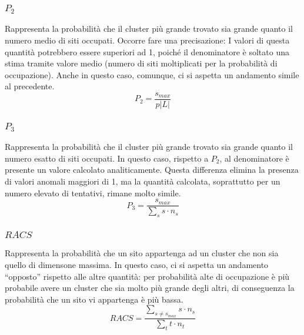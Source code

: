 \subsubsection*{$P_2$}
Rappresenta la probabilità che il cluster più grande trovato sia grande 
quanto il numero medio di siti occupati. Occorre fare una precisazione:
I valori di questa quantità potrebbero essere superiori ad 1, poiché il 
denominatore è soltato una stima tramite valore medio (numero di siti 
moltiplicati per la probabilità di occupazione).
Anche in questo caso, comunque, ci si aspetta un andamento simile al precedente.
\begin{equation}
    P_2=\frac{s_{max}}{p |L|}
\end{equation}
\subsubsection*{$P_3$}
Rappresenta la probabilità che il cluster più grande trovato sia grande 
quanto il numero esatto di siti occupati. In questo caso, rispetto a $P_2$,
al denominatore è presente un valore calcolato analiticamente. Questa differenza
elimina la presenza di valori anomali maggiori di 1, ma la quantità calcolata,
soprattutto per un numero elevato di tentativi, rimane molto simile.
\begin{equation}
    P_3 = \frac{s_{max}}{\sum_s s \cdot n_s}
\end{equation}
\subsubsection*{$RACS$}
Rappresenta la probabilità che un sito appartenga ad un cluster che non sia quello 
di dimensone massima. In questo caso, ci si aspetta un andamento ``opposto'' rispetto 
alle altre quantità: per probabilità alte di occupazione è più probabile avere un cluster
che sia molto più grande degli altri, di conseguenza la probabilità che un sito vi appartenga 
è più bassa.
\begin{equation}
    RACS = \frac{\sum_{s\neq s_{max}} s \cdot n_s}{\sum_t t \cdot n_t}
\end{equation}

